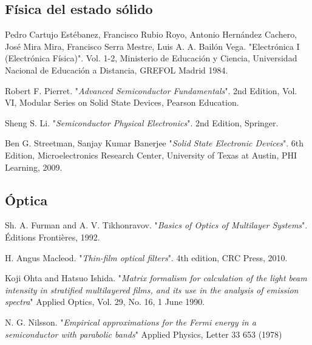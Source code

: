 








\begin{thebibliography}{9999999}




\subsection*{\hspace{-4.2em} Física del estado sólido}

	Pedro Cartujo Estébanez, Francisco Rubio Royo, Antonio Hernández Cachero, José Mira Mira, Francisco Serra Mestre, Luis A. A. Bailón Vega.
	"Electrónica I (Electrónica Física)".
	Vol. 1-2, Ministerio de Educación y Ciencia, Universidad Nacional de Educación a Distancia, GREFOL Madrid 1984.

	Robert F. Pierret.
	"\textit{Advanced Semiconductor Fundamentals}".
	2nd Edition, Vol. VI, Modular Series on Solid State Devices, Pearson Education.

	Sheng S. Li.
	"\textit{Semiconductor Physical Electronics}".
	2nd Edition, Springer.

	Ben G. Streetman, Sanjay Kumar Banerjee
	"\textit{Solid State Electronic Devices}".
	6th Edition, Microelectronics Research Center, University of Texas at Austin, PHI Learning, 2009.






\subsection*{\hspace{-4.2em} Óptica}

	Sh. A. Furman and A. V. Tikhonravov.
	"\textit{Basics of Optics of Multilayer Systems}".
	Éditions Frontières, 1992.

	H. Angus Macleod.
	"\textit{Thin-film optical filters}".
	4th edition, CRC Press, 2010.

	Koji Ohta and Hatsuo Ishida.
	"\textit{Matrix formalism for calculation of the light beam intensity in stratified multilayered films, and its use in the analysis of emission spectra}"	
	Applied Optics, Vol. 29, No. 16, 1 June 1990.

	N. G. Nilsson.
	"\textit{Empirical approximations for the Fermi energy in a semiconductor with parabolic bands}"
	Applied Physics, Letter 33 653 (1978)


\end{thebibliography}
